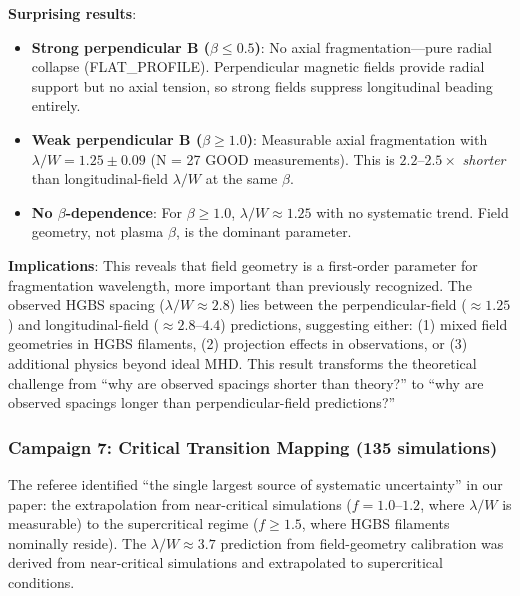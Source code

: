 \documentclass[twoside,twocolumn]{mnras}
\begin{document}
\textbf{Surprising results}:
\begin{itemize}
    \item \textbf{Strong perpendicular B ($\beta \leq 0.5$)}: No axial fragmentation---pure radial collapse (FLAT\_PROFILE). Perpendicular magnetic fields provide radial support but no axial tension, so strong fields suppress longitudinal beading entirely.
    \item \textbf{Weak perpendicular B ($\beta \geq 1.0$)}: Measurable axial fragmentation with $\lambda/W = 1.25 \pm 0.09$ (N = 27 GOOD measurements). This is $2.2$--$2.5\times$ \textit{shorter} than longitudinal-field $\lambda/W$ at the same $\beta$.
    \item \textbf{No $\beta$-dependence}: For $\beta \geq 1.0$, $\lambda/W \approx 1.25$ with no systematic trend. Field geometry, not plasma $\beta$, is the dominant parameter.
\end{itemize}

\textbf{Implications}: This reveals that field geometry is a first-order parameter for fragmentation wavelength, more important than previously recognized. The observed HGBS spacing ($\lambda/W \approx 2.8$) lies between the perpendicular-field ($\approx 1.25$) and longitudinal-field ($\approx 2.8$--$4.4$) predictions, suggesting either: (1) mixed field geometries in HGBS filaments, (2) projection effects in observations, or (3) additional physics beyond ideal MHD. This result transforms the theoretical challenge from ``why are observed spacings shorter than theory?'' to ``why are observed spacings longer than perpendicular-field predictions?''

\subsubsection{Campaign 7: Critical Transition Mapping (135 simulations)}

The referee identified ``the single largest source of systematic uncertainty'' in our paper: the extrapolation from near-critical simulations ($f = 1.0$--$1.2$, where $\lambda/W$ is measurable) to the supercritical regime ($f \geq 1.5$, where HGBS filaments nominally reside). The $\lambda/W \approx 3.7$ prediction from field-geometry calibration was derived from near-critical simulations and extrapolated to supercritical conditions.
\end{document}
